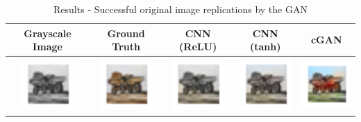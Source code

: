 \documentclass{article}
\begin{document}
\begin{table}[h!]
  \caption{Results - Successful original image replications by the GAN}
  \label{tab:2}
  \centering
  \begin{tabular}{ccccc}
    \toprule
    Grayscale Image & Ground Truth & CNN (ReLU) & CNN (tanh) & cGAN \\
    \midrule
    \includegraphics[width=2cm]{results3/171-bw.png} & \includegraphics[width=2cm]{results3/171-gt.png} & \includegraphics[width=2cm]{results5/171-relucnn.png} & \includegraphics[width=2cm]{results5/171-tanhcnn.png} & \includegraphics[width=2cm]{results3/171-gan.png} \\

\end{tabular}
\end{table}
\end{document}
